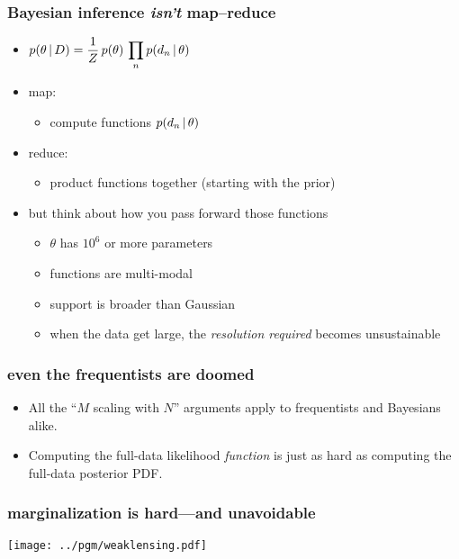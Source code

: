 \documentclass[pdftex]{beamer}
\begin{document}
\begin{frame}
  \frametitle{Bayesian inference \emph{isn't} map--reduce}
  \begin{itemize}
  \item $\displaystyle p(\theta\,|\, D) = \frac{1}{Z}\,p(\theta)\,\prod_n p(d_n\,|\,\theta)$
  \item map:
    \begin{itemize}
    \item compute functions $p(d_n\,|\,\theta)$
    \end{itemize}
  \item reduce:
    \begin{itemize}
    \item product functions together (starting with the prior)
    \end{itemize}
  \item but think about how you pass forward those functions
    \begin{itemize}
    \item $\theta$ has $10^6$ or more parameters
    \item functions are multi-modal
    \item support is broader than Gaussian
    \item when the data get large, the \emph{resolution required} becomes unsustainable
    \end{itemize}
  \end{itemize}
\end{frame}

\begin{frame}
  \frametitle{even the frequentists are doomed}
  \begin{itemize}
  \item All the ``$M$ scaling with $N$'' arguments apply to frequentists and Bayesians alike.
  \item Computing the full-data likelihood \emph{function} is just as hard as computing the full-data posterior PDF.
  \end{itemize}
\end{frame}

\begin{frame}
  \frametitle{marginalization is hard---and unavoidable}
  \texttt{[image: ../pgm/weaklensing.pdf]}
\end{frame}
\end{document}
